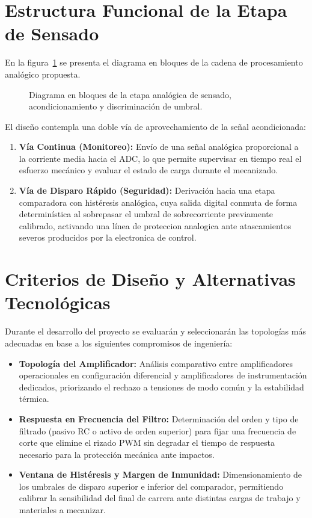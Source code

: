 \section{Estructura Funcional de la Etapa de Sensado}
\label{sec:ea2_estructura}

En la figura~\ref{crkt.ej2:sensado_opamp} se presenta el diagrama en bloques de la cadena de procesamiento analógico
propuesta.

\begin{figure}[!ht]
  \centering
  \resizebox{0.95\linewidth}{!}{}
  \caption{Diagrama en bloques de la etapa analógica de sensado, acondicionamiento y discriminación de umbral.}
  \label{crkt.ej2:sensado_opamp}
\end{figure}

El diseño contempla una doble vía de aprovechamiento de la señal acondicionada:
\begin{enumerate}
  \item \textbf{Vía Continua (Monitoreo):} Envío de una señal analógica proporcional a la corriente media hacia el ADC,
    lo que permite supervisar en tiempo real el esfuerzo mecánico y evaluar el estado de carga durante el mecanizado.
  \item \textbf{Vía de Disparo Rápido (Seguridad):} Derivación hacia una etapa comparadora con histéresis analógica,
    cuya salida digital conmuta de forma determinística al sobrepasar el umbral de sobrecorriente previamente
    calibrado, activando una línea de proteccion analogica ante atascamientos severos producidos por la electronica de
    control.
\end{enumerate}

\section{Criterios de Diseño y Alternativas Tecnológicas}
\label{sec:ea2_criterios}

Durante el desarrollo del proyecto se evaluarán y seleccionarán las topologías más adecuadas en base a los
siguientes compromisos de ingeniería:

\begin{itemize}
  \item \textbf{Topología del Amplificador:} Análisis comparativo entre amplificadores operacionales en configuración
    diferencial y amplificadores de instrumentación dedicados, priorizando el rechazo a tensiones de modo común y la
    estabilidad térmica.
  \item \textbf{Respuesta en Frecuencia del Filtro:} Determinación del orden y tipo de filtrado (pasivo RC o activo de
    orden superior) para fijar una frecuencia de corte que elimine el rizado PWM sin degradar el tiempo de respuesta
    necesario para la protección mecánica ante impactos.
  \item \textbf{Ventana de Histéresis y Margen de Inmunidad:} Dimensionamiento de los umbrales de disparo superior e
    inferior del comparador, permitiendo calibrar la sensibilidad del final de carrera ante distintas cargas de trabajo
    y materiales a mecanizar.
\end{itemize}

